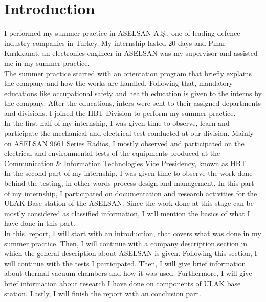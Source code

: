 \blankpage



\tableofcontents
\newpage



\section{Introduction}
\-\indent 
	I performed my summer practice in ASELSAN A.Ş., one of leading defence industry companies in Turkey. My internship lasted 20 days and Pınar Kırıkkanat, an electronics engineer in ASELSAN was my supervisor and assisted me in my summer practice. \\

	The summer practice started with an orientation program that briefly explains the company and how the works are handled. Following that, mandatory educations like occupational safety and health education is given to the interns by the company. After the educations, inters were sent to their assigned departments and divisions. I joined the HBT Division to perform my summer practice.\\
	
	In the first half of my internship, I was given time to observe, learn and participate the mechanical and electrical test conducted at our division. Mainly on ASELSAN 9661 Series Radios, I mostly observed and participated on the electrical and environmental tests of the equipments produced at the Communication \& Information Technologies Vice Presidency, known as HBT.\\
	
	In the second part of my internship, I was given time to observe the work done behind the testing, in other words process design and management. In this part of my internship, I participated on documentation and research activities for the ULAK Base station of the ASELSAN. Since the work done at this stage can be mostly considered as classified information, I will mention the basics of what I have done in this part.\\
	
	In this, report, I will start with an introduction, that covers what was done in my summer practice. Then, I will continue with a company description section in which the general description about ASELSAN is given. Following this section, I will continue with the tests I participated. Then, I will give brief information about thermal vacuum chambers and how it was used. Furthermore, I will give brief information about research I have done on components of ULAK base station. Lastly, I will finish the report with an conclusion part. \\
	
